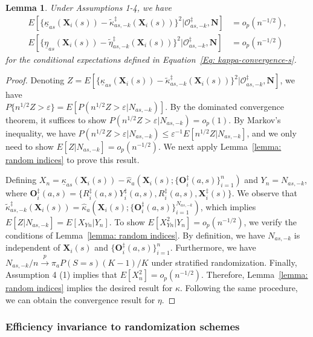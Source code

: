 \documentclass[12pt]{article}
\newtheorem{lemma}{Lemma}
\newcommand{\bX}{\boldsymbol{X}}
\newcommand{\bO}{\boldsymbol{O}}
\newcommand{\bN}{\boldsymbol{N}}
\begin{document}
\begin{lemma}\label{lemma: O_as-k}
Under Assumptions 1-4, we have
\begin{align*}
    E\left[\{\underline{\kappa}_{as}(\bX_i(s)) - \widetilde{\kappa}_{as,-k}^\ddagger(\bX_i(s))\}^2\bigg|\mathcal{O}_{as,-k}^\ddagger,\bN\right] &= o_p(n^{-1/2}), \\
    E\left[\{\underline{\eta}_{as}(\bX_i(s)) - \widetilde{\eta}_{as,-k}^\ddagger(\bX_i(s))\}^2\bigg|\mathcal{O}_{as,-k}^\ddagger,\bN\right] &= o_p(n^{-1/2})
\end{align*}
for the conditional expectations defined in Equation~\eqref{Eq: kappa-convergence-s}.
\end{lemma}
\begin{proof}
Denoting $Z= E\left[\{\underline{\kappa}_{as}(\bX_i(s)) - \widetilde{\kappa}_{as,-k}^\ddagger(\bX_i(s))\}^2\bigg|\mathcal{O}_{as,-k}^\ddagger,\bN\right]$, we have\\ $P\{n^{1/2}Z>\varepsilon\} = E[P(n^{1/2}Z>\varepsilon|N_{as,-k})]$. By the dominated convergence theorem, it suffices to show $P(n^{1/2}Z>\varepsilon|N_{as,-k}) = o_p(1)$. By Markov's inequality, we have $P(n^{1/2}Z>\varepsilon|N_{as,-k}) \le\varepsilon^{-1} E[n^{1/2}Z|N_{as,-k}]$, and we only need to show $E[Z|N_{as,-k}] = o_p(n^{-1/2})$. We next apply Lemma~\ref{lemma: random indices} to prove this result.

Defining $X_n = \underline{\kappa}_{as}(\bX_i(s)) - \widehat{\kappa}_{a}(\bX_i(s); \{\bO_i^\ddagger(a,s)\}_{i=1}^n)$ and $Y_n = N_{as,-k}$, where $\bO_i^\ddagger(a,s)=\{R_i^\ddagger(a,s) Y_i^\ddagger(a,s), R_i^\ddagger(a,s),\bX_i^\ddagger(s)\}$. We observe that $\widetilde{\kappa}_{as,-k}^\ddagger(\bX_i(s)) =  \widehat{\kappa}_{a}(\bX_i(s); \{\bO_i^\ddagger(a,s)\}_{i=1}^{N_{as,-k}})$, which implies $ E[Z|N_{as,-k}] = E[X_{Yn}|Y_n]$. To show $E[X_{Yn}^2|Y_n] = o_p(n^{-1/2})$, we verify the conditions of Lemma~\ref{lemma: random indices}. By definition, we have $N_{as,-k}$ is independent of $\bX_i(s)$ and $\{\bO_i^\ddagger(a,s)\}_{i=1}^n$. Furthermore, we have $N_{as,-k}/n \xrightarrow{p} \pi_a P(S=s)(K-1)/K$ under stratified randomization. Finally, Assumption 4 (1) implies that $E[X_n^2] = o_p(n^{-1/2})$. Therefore, Lemma~\ref{lemma: random indices} implies the desired result for $\kappa$. Following the same procedure, we can obtain the convergence result for $\eta$. 
\end{proof}

\subsubsection{Efficiency invariance to randomization schemes}
\end{document}
